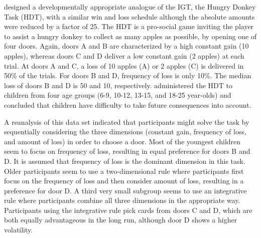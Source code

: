 \documentclass[a4paper,12pt,man]{apa} %
\newcommand{\citet}{\citeA}
\begin{document}
\citet{Crone2004} designed a developmentally appropriate analogue of
the IGT, the Hungry Donkey Task (HDT), with a similar win and loss
schedule although the absolute amounts were reduced by a factor of 25.
The HDT is a pro-social game inviting the player to assist a hungry
donkey to collect as many apples as possible, by opening one of four
doors.  Again, doors A and B are characterized by a high constant gain
(10 apples), whereas doors C and D deliver a low constant gain (2
apples) at each trial.  At doors A and C, a loss of 10 apples (A) or 2
apples (C) is delivered in 50\% of the trials.  For doors B and D,
frequency of loss is only 10\%.  The median loss of doors B and D is
50 and 10, respectively.  \citet{Crone2004} administered the HDT to
children from four age groups (6-9, 10-12, 13-15, and 18-25 year-olds)
and concluded that children have difficulty to take future
consequences into account.

A reanalysis of this data set \cite{Huizenga2007b} indicated that
participants might solve the task by sequentially considering the
three dimensions (constant gain, frequency of loss, and amount of
loss) in order to choose a door.  Most of the youngest children seem
to focus on frequency of loss, resulting in equal preference for doors
B and D. It is assumed that frequency of loss is the dominant
dimension in this task.  Older participants seem to use a
two-dimensional rule where participants first focus on the frequency
of loss and then consider amount of loss, resulting in a preference
for door D. A third very small subgroup seems to use an integrative
rule where participants combine all three dimensions in the
appropriate way.  Participants using the integrative rule pick cards
from doors C and D, which are both equally advantageous in the long
run, although door D shows a higher volatility. 

\end{document}

